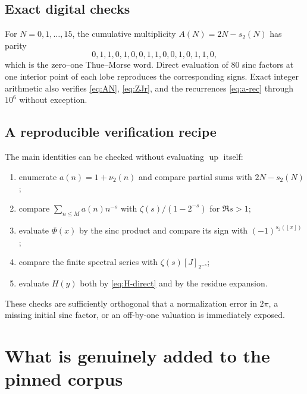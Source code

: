 \documentclass[11pt,oneside]{article}
\numberwithin{equation}{section}
\theoremstyle{definition}
\theoremstyle{remark}
\newcommand{\Up}{\operatorname{up}}
\newcommand{\floor}[1]{\left\lfloor #1\right\rfloor}
\begin{document}
\subsection{Exact digital checks}

For $N=0,1,\ldots,15$, the cumulative multiplicity
$A(N)=2N-s_2(N)$ has parity
\[
 0,1,1,0,1,0,0,1,1,0,0,1,0,1,1,0,
\]
which is the zero--one Thue--Morse word.  Direct evaluation of 80 sinc factors at
one interior point of each lobe reproduces the corresponding signs.  Exact
integer arithmetic also verifies \eqref{eq:AN}, \eqref{eq:ZJr}, and the
recurrences \eqref{eq:a-rec} through $10^6$ without exception.

\subsection{A reproducible verification recipe}

The main identities can be checked without evaluating $\Up$ itself:
\begin{enumerate}
\item enumerate $a(n)=1+\nu_2(n)$ and compare partial sums with $2N-s_2(N)$;
\item compare $\sum_{n\le M}a(n)n^{-s}$ with
      $\zeta(s)/(1-2^{-s})$ for $\Re s>1$;
\item evaluate $\Phi(x)$ by the sinc product and compare its sign with
      $(-1)^{s_2(\floor x)}$;
\item compare the finite spectral series with $\zeta(s)[J]_{2^{-s}}$;
\item evaluate $H(y)$ both by \eqref{eq:H-direct} and by the residue expansion.
\end{enumerate}
These checks are sufficiently orthogonal that a normalization error in $2\pi$,
a missing initial sinc factor, or an off-by-one valuation is immediately exposed.

\section{What is genuinely added to the pinned corpus}
\label{sec:novelty}
\end{document}
